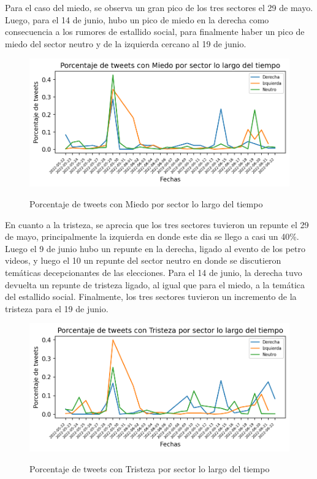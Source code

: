 Para el caso del miedo, se observa un gran pico de los tres sectores el 29 de mayo. Luego, para el 14 de junio, hubo un pico de miedo en la derecha como consecuencia a los rumores de estallido social, para finalmente haber un pico de miedo del sector neutro y de la izquierda cercano al 19 de junio.

\begin{figure}[h]
	\caption{Porcentaje de tweets con Miedo por sector lo largo del tiempo}
	\centering
	\includegraphics{../Images/Results/Porcentaje de tweets con Miedo por sector lo largo del tiempo.png} 
	\label{figure:tweets_percent_Miedo_tiempo}
\end{figure}


En cuanto a la tristeza, se aprecia que los tres sectores tuvieron un repunte el 29 de mayo, principalmente la izquierda en donde este dia se llego a casi un 40\%. Luego el 9 de junio hubo un repunte en la derecha, ligado al evento de los petro videos, y luego el 10 un repunte del sector neutro en donde se discutieron temáticas decepcionantes de las elecciones. Para el 14 de junio, la derecha tuvo devuelta un repunte de tristeza ligado, al igual que para el miedo, a la temática del estallido social. Finalmente, los tres sectores tuvieron un incremento de la tristeza para el 19 de junio.

\begin{figure}[h]
	\caption{Porcentaje de tweets con Tristeza por sector lo largo del tiempo}
	\centering
	\includegraphics{../Images/Results/Porcentaje de tweets con Tristeza por sector lo largo del tiempo.png} 
	\label{figure:tweets_percent_Tristeza_tiempo}
\end{figure}

